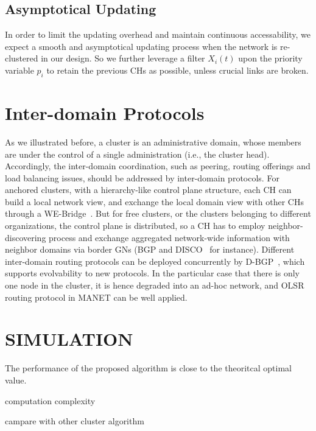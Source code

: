 \documentclass[conference]{IEEEtran}
\begin{document}
\subsection{Asymptotical Updating}
In order to limit the updating overhead and maintain continuous accessability, we expect a smooth and asymptotical updating process when the network is re-clustered in our design. So we further leverage a filter $X_i(t)$ upon the priority variable $p_i$ to retain the previous CHs as possible, unless crucial links are broken.
\section{Inter-domain Protocols}
As we illustrated before, a cluster is an administrative domain, whose members are under the control of a single administration (i.e., the cluster head). Accordingly, the inter-domain coordination, such as peering, routing offerings and load balancing issues, should be addressed by inter-domain protocols. For anchored clusters, with a hierarchy-like control plane structure, each CH can build a local network view, and exchange the local domain view with other CHs through a WE-Bridge~\cite{lin2014we}. But for free clusters, or the clusters belonging to different organizations, the control plane is distributed, so a CH has to employ neighbor-discovering process and exchange aggregated network-wide information with neighbor domains via border GNs (BGP and DISCO~\cite{phemius2014disco} for instance). Different inter-domain routing protocols can be deployed concurrently by D-BGP~\cite{sambasivanbootstrapping}, which  supports evolvability to new protocols. In the particular case that there is only one node in the cluster, it is hence degraded into an ad-hoc network, and OLSR routing protocol in MANET can be well applied.

\section{SIMULATION}
The performance of the proposed algorithm is close to the theoritcal optimal value.

computation complexity

campare with other cluster algorithm
\end{document}
